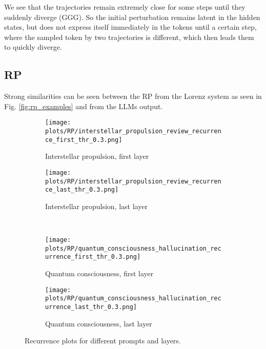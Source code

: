 \documentclass[a4paper,12pt]{article}
\begin{document}
We see that the trajectories remain extremely close for some steps until they suddenly diverge (GGG). So the initial perturbation remains latent in the hidden states, but does not express itself immediately in the tokens until a certain step, where the sampled token by two trajectories is different, which then leads them to quickly diverge.

\subsection{RP}
\label{subsec:rp_results}

Strong similarities can be seen between the RP from the Lorenz \cite{DeterministicNonperiodicFlow} system as seen in Fig. \ref{fig:rp_examples} and from the LLMs output. %
\begin{figure}[H]
    \centering
    \begin{subfigure}[b]{0.48\textwidth}
        \centering
        \texttt{[image: plots/RP/interstellar\_propulsion\_review\_recurrence\_first\_thr\_0.3.png]}
        \caption{Interstellar propulsion, first layer}
    \end{subfigure}\hfill
    \begin{subfigure}[b]{0.48\textwidth}
        \centering
        \texttt{[image: plots/RP/interstellar\_propulsion\_review\_recurrence\_last\_thr\_0.3.png]}
        \caption{Interstellar propulsion, last layer}
    \end{subfigure}
    \\[0.5em]
    \begin{subfigure}[b]{0.48\textwidth}
        \centering
        \texttt{[image: plots/RP/quantum\_consciousness\_hallucination\_recurrence\_first\_thr\_0.3.png]}
        \caption{Quantum consciousness, first layer}
    \end{subfigure}\hfill
    \begin{subfigure}[b]{0.48\textwidth}
        \centering
        \texttt{[image: plots/RP/quantum\_consciousness\_hallucination\_recurrence\_last\_thr\_0.3.png]}
        \caption{Quantum consciousness, last layer}
    \end{subfigure}
    \caption{Recurrence plots for different prompts and layers.}
    \label{fig:rp_comparison_layers}           
\end{figure}
\end{document}
